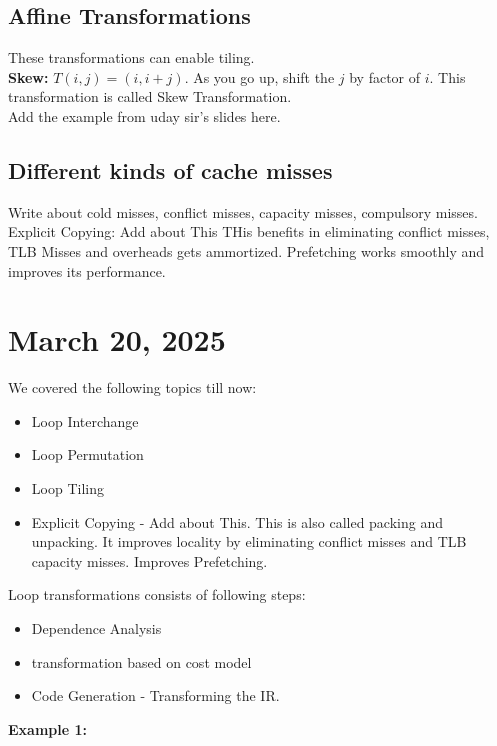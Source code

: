 \documentclass{article}
\begin{document}
\subsection*{Affine Transformations}
These transformations can enable tiling. \\
\textbf{Skew: } $T(i,j) = (i,i+j)$. As you go up, shift the $j$ by factor of $i$. This transformation is called Skew Transformation. \\ 
Add the example from uday sir's slides here. \\

\subsection*{Different kinds of cache misses}
Write about cold misses, conflict misses, capacity misses, compulsory misses. \\

Explicit Copying: Add about This
THis benefits in eliminating conflict misses, TLB Misses and overheads gets ammortized. Prefetching works smoothly and improves its performance. \\

\section*{March 20, 2025}
We covered the following topics till now:
\begin{itemize}
    \item Loop Interchange
    \item Loop Permutation 
    \item Loop Tiling
    \item Explicit Copying - Add about This. This is also called packing and unpacking. It improves locality by eliminating conflict misses and TLB capacity misses. Improves Prefetching.
\end{itemize}

Loop transformations consists of following steps:
\begin{itemize}
    \item Dependence Analysis
    \item transformation based on cost model
    \item Code Generation - Transforming the IR.
\end{itemize}


\textbf{Example 1:}
\end{document}

